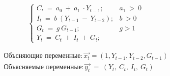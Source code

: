 \documentclass[12pt,a4paper]{article}
\begin{document}
\begin{equation*}
\begin{cases}
C_{t} \ =\ a_{0} \ +\ a_{1} \ \cdot Y_{t - 1} ; & a_{1} \  >\ 0\\
I_{t} \ =\ b \ ( Y_{t-1} \ -\ Y_{t-2}) ; & b \  >0\\
G_{t} \ =\ g \ G_{t-1} ; & g >1\\
Y_{t} \ =\ C_{t} \ +\ I_{t} \ +\ G_{t} ; & 
\end{cases}
\end{equation*}

\begin{gather*}
\text{Объсняющие\ переменные}:\overrightarrow{x_{t}} =( 1,  Y_{t-1} ,Y_{t-2} , G_{t-1})\\
\text{Объясняемые\ переменные}:\overrightarrow{y_t} \ =\ ( Y_{t} ,\ C_{t} ,\ I_{t} ,\ G_{t})
\end{gather*}
\end{document}
